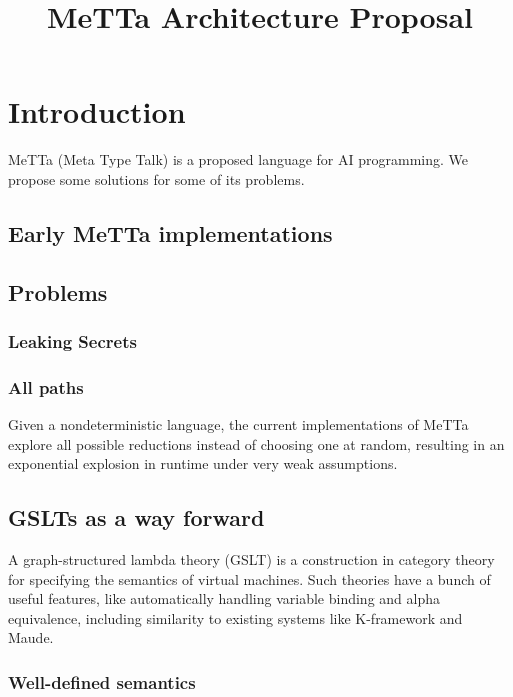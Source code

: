 \documentclass{article}
\title{MeTTa Architecture Proposal}
\author{}
\date{}
\begin{document}
\maketitle

\section{Introduction}

MeTTa (Meta Type Talk) is a proposed language for AI programming. We propose some solutions for some of its problems.

\subsection{Early MeTTa implementations}

\subsection{Problems}

\subsubsection{Leaking Secrets}

\subsubsection{All paths}

Given a nondeterministic language, the current implementations of MeTTa explore all possible reductions instead of choosing one at random, resulting in an exponential explosion in runtime under very weak assumptions.

\subsection{GSLTs as a way forward}

A graph-structured lambda theory (GSLT) is a construction in category theory for specifying the semantics of virtual machines.  Such theories have a bunch of useful features, like automatically handling variable binding and alpha equivalence, including similarity to existing systems like K-framework and Maude.

\subsubsection{Well-defined semantics}
\end{document}
